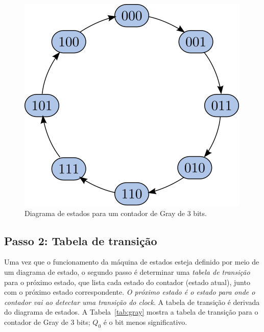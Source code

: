 \documentclass[a4paper]{article}
\begin{document}
\begin{figure}[!htp]
\begin{center}
\includegraphics{images/gray_counter_states}
\caption{Diagrama de estados para um contador de Gray de $3$ bits.}
\label{fig:gray_state_diagram}
\end{center}
\end{figure}

\subsection{Passo 2: Tabela de transição}

Uma vez que o funcionamento da máquina de estados esteja definido
por meio de um diagrama de estado, o segundo passo é determinar uma
\emph{tabela de transição} para o próximo estado, que lista cada
estado do contador (estado atual), junto com o próximo estado
correspondente. \emph{O próximo estado é o estado para onde o
contador vai ao detectar uma transição do clock}.  A tabela de transição
é derivada do diagrama de estados. A Tabela~\ref{tab:gray} mostra
a tabela de transição para o contador de Gray de $3$ bits; $Q_0$
é o bit menos significativo.
\end{document}
